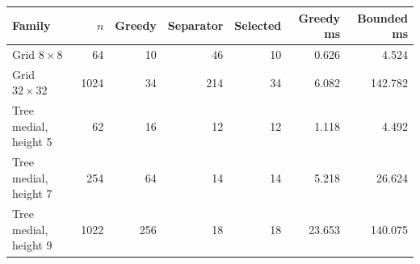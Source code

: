 \begin{tabular}{@{}lrrrrrr@{}}
\toprule
Family & $n$ & Greedy & Separator & Selected & Greedy ms & Bounded ms \\
\midrule
Grid $8\times8$ & 64 & 10 & 46 & 10 & 0.626 & 4.524 \\
Grid $32\times32$ & 1024 & 34 & 214 & 34 & 6.082 & 142.782 \\
Tree medial, height 5 & 62 & 16 & 12 & 12 & 1.118 & 4.492 \\
Tree medial, height 7 & 254 & 64 & 14 & 14 & 5.218 & 26.624 \\
Tree medial, height 9 & 1022 & 256 & 18 & 18 & 23.653 & 140.075 \\
\bottomrule
\end{tabular}
